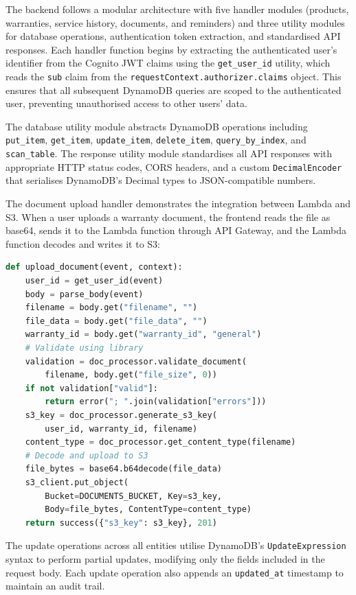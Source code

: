 \documentclass[conference]{IEEEtran}
\begin{document}
The backend follows a modular architecture with five handler modules (products, warranties, service history, documents, and reminders) and three utility modules for database operations, authentication token extraction, and standardised API responses. Each handler function begins by extracting the authenticated user's identifier from the Cognito JWT claims using the \texttt{get\_user\_id} utility, which reads the \texttt{sub} claim from the \texttt{requestContext.authorizer.claims} object. This ensures that all subsequent DynamoDB queries are scoped to the authenticated user, preventing unauthorised access to other users' data.

The database utility module abstracts DynamoDB operations including \texttt{put\_item}, \texttt{get\_item}, \texttt{update\_item}, \texttt{delete\_item}, \texttt{query\_by\_index}, and \texttt{scan\_table}. The response utility module standardises all API responses with appropriate HTTP status codes, CORS headers, and a custom \texttt{DecimalEncoder} that serialises DynamoDB's Decimal types to JSON-compatible numbers.

The document upload handler demonstrates the integration between Lambda and S3. When a user uploads a warranty document, the frontend reads the file as base64, sends it to the Lambda function through API Gateway, and the Lambda function decodes and writes it to S3:

\begin{lstlisting}[language=Python, caption={Document upload through Lambda to S3}]
def upload_document(event, context):
    user_id = get_user_id(event)
    body = parse_body(event)
    filename = body.get("filename", "")
    file_data = body.get("file_data", "")
    warranty_id = body.get("warranty_id", "general")
    # Validate using library
    validation = doc_processor.validate_document(
        filename, body.get("file_size", 0))
    if not validation["valid"]:
        return error("; ".join(validation["errors"]))
    s3_key = doc_processor.generate_s3_key(
        user_id, warranty_id, filename)
    content_type = doc_processor.get_content_type(filename)
    # Decode and upload to S3
    file_bytes = base64.b64decode(file_data)
    s3_client.put_object(
        Bucket=DOCUMENTS_BUCKET, Key=s3_key,
        Body=file_bytes, ContentType=content_type)
    return success({"s3_key": s3_key}, 201)
\end{lstlisting}

The update operations across all entities utilise DynamoDB's \texttt{UpdateExpression} syntax to perform partial updates, modifying only the fields included in the request body. Each update operation also appends an \texttt{updated\_at} timestamp to maintain an audit trail.
\end{document}
